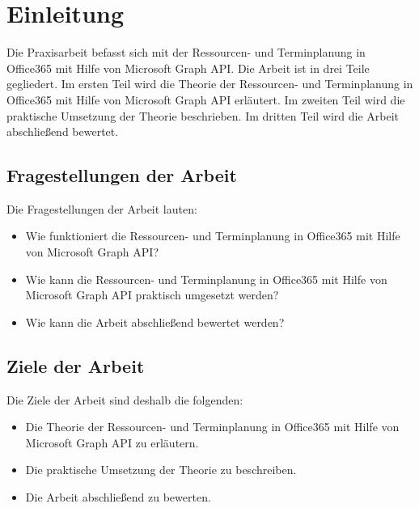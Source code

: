 


        \section{Einleitung}
Die Praxisarbeit befasst sich mit der Ressourcen- und Terminplanung in Office365 mit Hilfe von Microsoft Graph API. Die Arbeit ist in drei Teile gegliedert. Im ersten Teil wird die Theorie der Ressourcen- und Terminplanung in Office365 mit Hilfe von Microsoft Graph API erläutert. Im zweiten Teil wird die praktische Umsetzung der Theorie beschrieben. Im dritten Teil wird die Arbeit abschließend bewertet.
    \newline
    \subsection{Fragestellungen der Arbeit}
    Die Fragestellungen der Arbeit lauten:
    \begin{itemize}
        \item Wie funktioniert die Ressourcen- und Terminplanung in Office365 mit Hilfe von Microsoft Graph API?
        \item Wie kann die Ressourcen- und Terminplanung in Office365 mit Hilfe von Microsoft Graph API praktisch umgesetzt werden?
        \item Wie kann die Arbeit abschließend bewertet werden?
    \end{itemize}
    \subsection{Ziele der Arbeit}
    Die Ziele der Arbeit sind deshalb die folgenden:
    \begin{itemize}
        \item Die Theorie der Ressourcen- und Terminplanung in Office365 mit Hilfe von Microsoft Graph API zu erläutern.
        \item Die praktische Umsetzung der Theorie zu beschreiben.
        \item Die Arbeit abschließend zu bewerten.
    \end{itemize}


